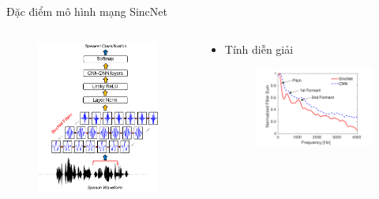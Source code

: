 \documentclass[notheorems, aspectratio=54]{beamer}
\begin{document}
\begin{frame}{Đặc điểm mô hình mạng SincNet}
	\begin{columns}
		\begin{column}{0.47\textwidth}
			\begin{figure}[H]
				\includegraphics[width=0.9\linewidth]{images/SincNet.png}
			\end{figure}
		\end{column}
		\begin{column}{0.5\textwidth}
			\begin{itemize}
				\item Tính diễn giải
				\begin{figure}[H]
					\includegraphics[width=1\linewidth]{images/interpretability.png}
				\end{figure}
			\end{itemize}
		\end{column}
	\end{columns}
\end{frame}
\end{document}
